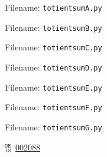 \documentclass[12pt]{article}
\newcommand{\oeisref}[1]{$^{\texttt{OE}}_{\texttt{IS}}$~\href{https://oeis.org/#1}{#1}}
\begin{document}
Filename: \texttt{totientsumA.py}
%

Filename: \texttt{totientsumB.py}
%

Filename: \texttt{totientsumC.py}
%

Filename: \texttt{totientsumD.py}
%

Filename: \texttt{totientsumE.py}
%

Filename: \texttt{totientsumF.py}
%

Filename: \texttt{totientsumG.py}
%



\nocite{*}

\oeisref{002088}

\setlength{\bibitemsep}{\parskip}
\printbibliography[heading=bibnumbered]
\end{document}
